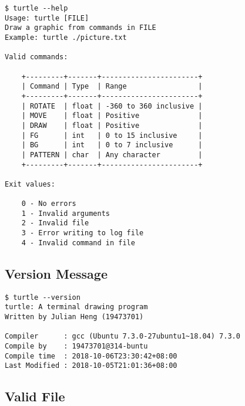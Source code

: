 \documentclass[a4paper, 12pt, titlepage]{article}
\begin{document}
\begin{lstlisting}
$ turtle --help
Usage: turtle [FILE]
Draw a graphic from commands in FILE
Example: turtle ./picture.txt

Valid commands:

    +---------+-------+-----------------------+
    | Command | Type  | Range                 |
    +---------+-------+-----------------------+
    | ROTATE  | float | -360 to 360 inclusive |
    | MOVE    | float | Positive              |
    | DRAW    | float | Positive              |
    | FG      | int   | 0 to 15 inclusive     |
    | BG      | int   | 0 to 7 inclusive      |
    | PATTERN | char  | Any character         |
    +---------+-------+-----------------------+

Exit values:

    0 - No errors
    1 - Invalid arguments
    2 - Invalid file
    3 - Error writing to log file
    4 - Invalid command in file

\end{lstlisting}

\subsection{Version Message}

\begin{lstlisting}
$ turtle --version
turtle: A terminal drawing program
Written by Julian Heng (19473701)

Compiler      : gcc (Ubuntu 7.3.0-27ubuntu1~18.04) 7.3.0
Compile by    : 19473701@314-buntu
Compile time  : 2018-10-06T23:30:42+08:00
Last Modified : 2018-10-05T21:01:36+08:00
\end{lstlisting}

\subsection{Valid File}
\end{document}
